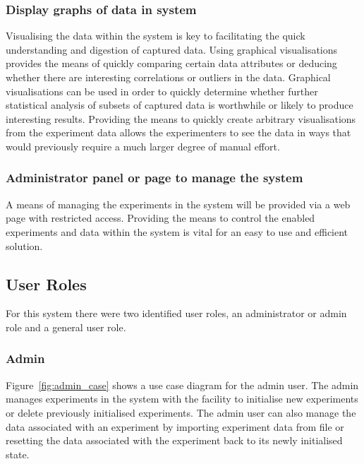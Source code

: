 \subsubsection{Display graphs of data in system}  Visualising the data within the system is key to facilitating the quick understanding and digestion of captured data. Using graphical visualisations provides the means of quickly comparing certain data attributes or deducing whether there are interesting correlations or outliers in the data. Graphical visualisations can be used in order to quickly determine whether further statistical analysis of subsets of captured data is worthwhile or likely to produce interesting results. Providing the means to quickly create arbitrary visualisations from the experiment data allows the experimenters to see the data in ways that would previously require a much larger degree of manual effort.

\subsubsection{Administrator panel or page to manage the system}  A means of managing the experiments in the system will be provided via a web page with restricted access. Providing the means to control the enabled experiments and data within the system is vital for an easy to use and efficient solution.








\subsection{User Roles}
For this system there were two identified user roles, an administrator or admin role and a general user role.

\subsubsection{Admin}

Figure~\ref{fig:admin_case} shows a use case diagram for the admin user. The admin manages experiments in the system with the facility to initialise new experiments or delete previously initialised experiments. The admin user can also manage the data associated with an experiment by importing experiment data from file or resetting the data associated with the experiment back to its newly initialised state.

